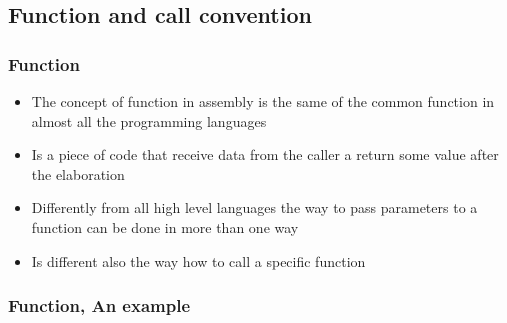 \documentclass[]{beamer}
\begin{document}
\subsection{Function and call convention}
		\begin{frame}
			\frametitle{Function}
			\begin{itemize}
				\item{The concept of function in assembly is the same of the common function in almost all the programming languages }
				\item{Is a piece of code that receive data from the caller a return some value after the elaboration}
				\item{Differently from all high level languages the way to pass parameters to a function can be done in more than one way}
				\item{Is different also the way how to call a specific function}
			\end{itemize}
		\end{frame}
		\begin{frame}
			\frametitle{Function, An example}
				\begin{figure}
				\end{figure}
		\end{frame}
\end{document}
